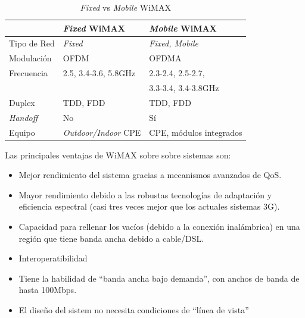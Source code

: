 \documentclass[10pt,journal,compsoc]{IEEEtran}
\begin{document}
\begin{table}[h!]
    \centering
    \begin{tabular}{l|l|l}
        \toprule[1.5pt]
         & \textbf{\emph{Fixed} WiMAX} & \textbf{\emph{Mobile} WiMAX}\\
        \midrule
        Tipo de Red & \emph{Fixed} & \emph{Fixed, Mobile} \\
        Modulación & OFDM & OFDMA \\
        Frecuencia & 2.5, 3.4-3.6, 5.8GHz & 2.3-2.4, 2.5-2.7,\\
                   &                      &3.3-3.4, 3.4-3.8GHz\\
        Duplex & TDD, FDD & TDD, FDD \\
        \emph{Handoff} & No & Sí \\
        Equipo & \emph{Outdoor/Indoor} CPE & CPE, módulos integrados \\
        \bottomrule[1.5pt]
    \end{tabular}
    \caption{\emph{Fixed} vs \emph{Mobile} WiMAX}
    \label{table:fixed-mobile}
\end{table}

Las principales ventajas de WiMAX sobre sobre sistemas son:
\begin{itemize}
    \item Mejor rendimiento del sistema gracias a mecanismos avanzados de QoS.
    \item Mayor rendimiento debido a las robustas tecnologías de adaptación y eficiencia espectral (casi tres veces mejor que los actuales sistemas 3G).
    \item Capacidad para rellenar los vacíos (debido a la conexión inalámbrica) en una región que tiene banda ancha debido a cable/DSL.
    \item Interoperatibilidad
    \item Tiene la habilidad de ``banda ancha bajo demanda'', con anchos de banda de hasta 100Mbps.
    \item El diseño del sistem no necesita condiciones de ``línea de vista'' 
\end{itemize}
\end{document}
